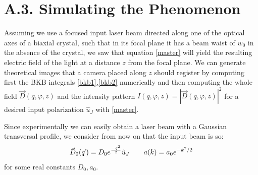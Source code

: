 \documentclass[11pt, a4paper, twoside]{article} %
\begin{document}
\section*{A.3. Simulating the Phenomenon \vspace{-0.2cm} }
Assuming we use a focused input laser beam directed along one of the optical axes of a biaxial crystal, such that in its focal plane it has a beam waist of $w_0$ in the absence of the crystal, we saw that equation \eqref{master} will yield the resulting electric field of the light at a distance $z$ from the focal plane.    We can generate theoretical images that a camera placed along $z$ should register by computing first the BKB integrals \eqref{bkb1},\eqref{bkb2} numerically and then computing the whole field $\vec{D}(q,\varphi,z)$ and the intensity pattern $I(q,\varphi,z)=|\vec{D}(q,\varphi,z)|^2$  for a desired input polarization $\hat{u}_J$ with \eqref{master}.

Since experimentally we can easily obtain a laser beam with a Gaussian transversal profile, we consider from now on that the input beam is so:\vspace{-0.15cm}
\begin{equation}\label{Four}
\vec{D}_0(\vec{q}\,)=D_0e^{\frac{-q^2}{2}}\hat{u}_J \quad \quad a(k)=a_0e^{-k^2/2}\vspace{-0.2cm}
\end{equation}
for some real constants $D_0,a_0$.
\end{document}
